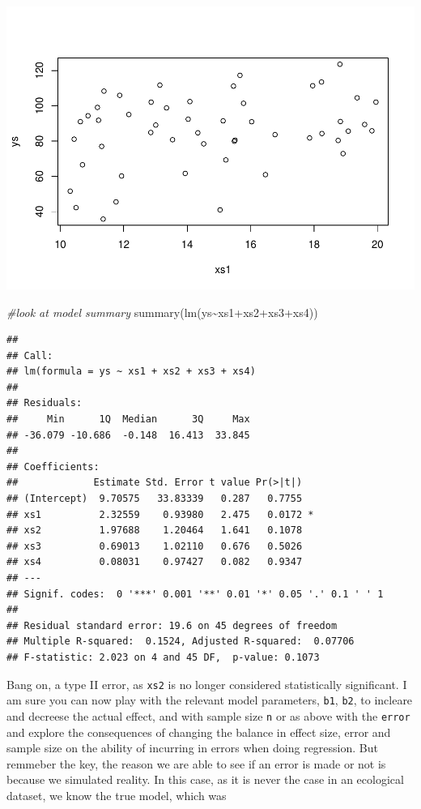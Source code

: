\documentclass[
]{book}
\newenvironment{Shaded}{\begin{snugshade}}{\end{snugshade}}
\newcommand{\CommentTok}[1]{\textcolor[rgb]{0.56,0.35,0.01}{\textit{#1}}}
\newcommand{\FunctionTok}[1]{\textcolor[rgb]{0.00,0.00,0.00}{#1}}
\newcommand{\NormalTok}[1]{#1}
\newcommand{\SpecialCharTok}[1]{\textcolor[rgb]{0.00,0.00,0.00}{#1}}
\begin{document}
\includegraphics{ECOMODbook_files/figure-latex/a7.7-1.pdf}

\begin{Shaded}
\begin{Highlighting}[]
\CommentTok{\#look at model summary}
\FunctionTok{summary}\NormalTok{(}\FunctionTok{lm}\NormalTok{(ys}\SpecialCharTok{\textasciitilde{}}\NormalTok{xs1}\SpecialCharTok{+}\NormalTok{xs2}\SpecialCharTok{+}\NormalTok{xs3}\SpecialCharTok{+}\NormalTok{xs4))}
\end{Highlighting}
\end{Shaded}

\begin{verbatim}
## 
## Call:
## lm(formula = ys ~ xs1 + xs2 + xs3 + xs4)
## 
## Residuals:
##     Min      1Q  Median      3Q     Max 
## -36.079 -10.686  -0.148  16.413  33.845 
## 
## Coefficients:
##             Estimate Std. Error t value Pr(>|t|)  
## (Intercept)  9.70575   33.83339   0.287   0.7755  
## xs1          2.32559    0.93980   2.475   0.0172 *
## xs2          1.97688    1.20464   1.641   0.1078  
## xs3          0.69013    1.02110   0.676   0.5026  
## xs4          0.08031    0.97427   0.082   0.9347  
## ---
## Signif. codes:  0 '***' 0.001 '**' 0.01 '*' 0.05 '.' 0.1 ' ' 1
## 
## Residual standard error: 19.6 on 45 degrees of freedom
## Multiple R-squared:  0.1524, Adjusted R-squared:  0.07706 
## F-statistic: 2.023 on 4 and 45 DF,  p-value: 0.1073
\end{verbatim}

Bang on, a type II error, as \texttt{xs2} is no longer considered statistically significant. I am sure you can now play with the relevant model parameters, \texttt{b1}, \texttt{b2}, to incleare and decreese the actual effect, and with sample size \texttt{n} or as above with the \texttt{error} and explore the consequences of changing the balance in effect size, error and sample size on the ability of incurring in errors when doing regression. But remmeber the key, the reason we are able to see if an error is made or not is because we simulated reality. In this case, as it is never the case in an ecological dataset, we know the true model, which was
\end{document}
